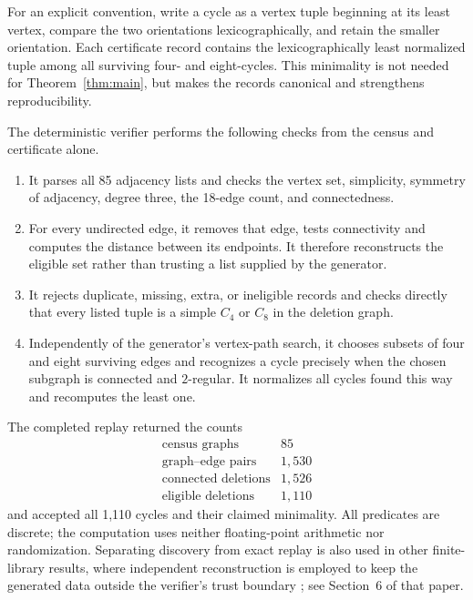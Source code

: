\documentclass[11pt]{article}
\begin{document}
For an explicit convention, write a cycle as a vertex tuple beginning at its
least vertex, compare the two orientations lexicographically, and retain the
smaller orientation.  Each certificate record contains the lexicographically
least normalized tuple among all surviving four- and eight-cycles.  This
minimality is not needed for Theorem~\ref{thm:main}, but makes the records
canonical and strengthens reproducibility.

The deterministic verifier performs the following checks from the census and
certificate alone.

\begin{enumerate}
\item It parses all 85 adjacency lists and checks the vertex set, simplicity,
      symmetry of adjacency, degree three, the 18-edge count, and
      connectedness.
\item For every undirected edge, it removes that edge, tests connectivity and
      computes the distance between its endpoints.  It therefore reconstructs
      the eligible set rather than trusting a list supplied by the generator.
\item It rejects duplicate, missing, extra, or ineligible records and checks
      directly that every listed tuple is a simple $C_4$ or $C_8$ in the
      deletion graph.
\item Independently of the generator's vertex-path search, it chooses subsets
      of four and eight surviving edges and recognizes a cycle precisely when
      the chosen subgraph is connected and $2$-regular.  It normalizes all
      cycles found this way and recomputes the least one.
\end{enumerate}

The completed replay returned the counts
\[
\begin{array}{c|r}
\text{census graphs}&85\\
\text{graph--edge pairs}&1{,}530\\
\text{connected deletions}&1{,}526\\
\text{eligible deletions}&1{,}110
\end{array}
\]
and accepted all 1,110 cycles and their claimed minimality.  All predicates
are discrete; the computation uses neither floating-point arithmetic nor
randomization.  Separating discovery from exact replay is also used in other
finite-library results, where independent reconstruction is employed to keep
the generated data outside the verifier's trust boundary
\cite{ZengEtAl2026}; see Section~6 of that paper.
\end{document}

